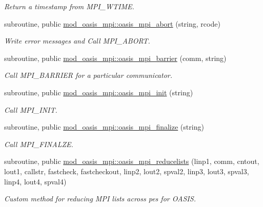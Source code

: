 \begin{DoxyCompactItemize}
\begin{DoxyCompactList}\small\item\em Return a timestamp from M\+P\+I\+\_\+\+W\+T\+I\+ME. \end{DoxyCompactList}\item 
subroutine, public \hyperlink{namespacemod__oasis__mpi_a5b21b6d8732d5f7b70d8b20cefe0072f}{mod\+\_\+oasis\+\_\+mpi\+::oasis\+\_\+mpi\+\_\+abort} (string, rcode)
\begin{DoxyCompactList}\small\item\em Write error messages and Call M\+P\+I\+\_\+\+A\+B\+O\+RT. \end{DoxyCompactList}\item 
subroutine, public \hyperlink{namespacemod__oasis__mpi_aaf477847380fbbbc1341520b0b3e66da}{mod\+\_\+oasis\+\_\+mpi\+::oasis\+\_\+mpi\+\_\+barrier} (comm, string)
\begin{DoxyCompactList}\small\item\em Call M\+P\+I\+\_\+\+B\+A\+R\+R\+I\+ER for a particular communicator. \end{DoxyCompactList}\item 
subroutine, public \hyperlink{namespacemod__oasis__mpi_aaf45f20e0000b32e71ec9ea8e806f57c}{mod\+\_\+oasis\+\_\+mpi\+::oasis\+\_\+mpi\+\_\+init} (string)
\begin{DoxyCompactList}\small\item\em Call M\+P\+I\+\_\+\+I\+N\+IT. \end{DoxyCompactList}\item 
subroutine, public \hyperlink{namespacemod__oasis__mpi_a0a601a3f718c0704db99a21b2c43fbcd}{mod\+\_\+oasis\+\_\+mpi\+::oasis\+\_\+mpi\+\_\+finalize} (string)
\begin{DoxyCompactList}\small\item\em Call M\+P\+I\+\_\+\+F\+I\+N\+A\+L\+ZE. \end{DoxyCompactList}\item 
subroutine, public \hyperlink{namespacemod__oasis__mpi_a95f6540150f7ab4e64697d2eabc2bf79}{mod\+\_\+oasis\+\_\+mpi\+::oasis\+\_\+mpi\+\_\+reducelists} (linp1, comm, cntout, lout1, callstr, fastcheck, fastcheckout, linp2, lout2, spval2, linp3, lout3, spval3, linp4, lout4, spval4)
\begin{DoxyCompactList}\small\item\em Custom method for reducing M\+PI lists across pes for O\+A\+S\+IS. \end{DoxyCompactList}\end{DoxyCompactItemize}
